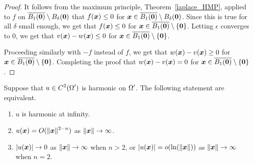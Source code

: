 \begin{proof}
It follows from the maximum principle, Theorem~\ref{laplace_HMP},
applied to $f$ on
$\displaystyle \overline{B_1({\bm{0}})} \setminus B_\delta({\bm{0}})$
that $f({\bm{x}}) \leq 0$ for
$\displaystyle {\bm{x}} \in \overline{B_1({\bm{0}})} \setminus B_\delta({\bm{0}})$.
Since this is true for all $\delta$ small enough, we get that
$f({\bm{x}}) \leq 0$ for
$\displaystyle {\bm{x}} \in \overline{B_1({\bm{0}})} \setminus \{{\bm{0}}\}$.
Letting $\epsilon$ converges to $0$, we get that
$\displaystyle v({\bm{x}}) - w({\bm{x}}) \leq 0$ for
$\displaystyle {\bm{x}} \in \overline{B_1({\bm{0}})} \setminus \{{\bm{0}}\}$.

Proceeding similarly with $-f$ instead of $f$, we get that
$\displaystyle w({\bm{x}}) - v({\bm{x}}) \geq 0$ for
$\displaystyle {\bm{x}} \in \overline{B_1({\bm{0}})} \setminus \{{\bm{0}}\}$.
Completing the proof that
$\displaystyle w({\bm{x}}) - v({\bm{x}}) = 0$ for
$\displaystyle {\bm{x}} \in \overline{B_1({\bm{0}})} \setminus \{{\bm{0}}\}$.
\end{proof}

\begin{prop} \label{pot_infty_u}
Suppose that $\displaystyle u\in C^2(\Omega^{\prime})$ is harmonic on
$\displaystyle \Omega^{\prime}$.
The following statement are equivalent.
\begin{enumerate}
\item $u$ is harmonic at infinity.
\item $\displaystyle u({\bm{x}}) = O(\|{\bm{x}}\|^{2-n})$ as
$\|{\bm{x}}\| \rightarrow \infty$.
\item $|u({\bm{x}})| \to 0 $ as $\|{\bm{x}}\| \rightarrow \infty$
when $n>2$, or
$|u({\bm{x}})| = o(\ln(\|{\bm{x}}\|))$ as $\|{\bm{x}}\| \rightarrow \infty$
when $n=2$.
\end{enumerate}
\end{prop}

